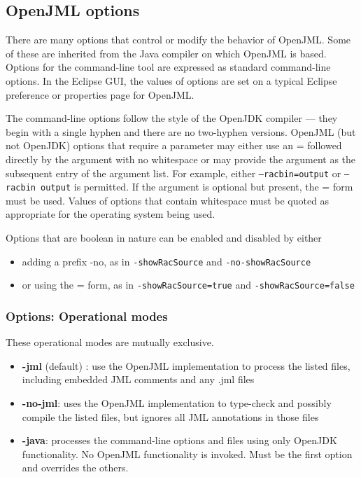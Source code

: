 \subsection{OpenJML options}

There are many options that control or modify the behavior of OpenJML. Some of these are inherited from the Java compiler on 
which OpenJML is based. Options for the command-line tool are expressed as standard command-line options. In the Eclipse GUI, the values of options are set on a typical Eclipse preference or properties page for OpenJML.

The command-line options follow the style of the OpenJDK compiler --- they begin 
with a single hyphen and there are no two-hyphen versions.
OpenJML (but not OpenJDK) options that require a parameter may either use an = followed directly by the argument with no whitespace or 
may provide the argument as the subsequent entry of the argument list. 
For example, either \texttt{--racbin=output} or
\texttt{--racbin output} is permitted. If the argument is optional 
but present, the = form must be used. Values of options that contain whitespace must be quoted as appropriate for the operating system being used.

Options that are boolean in nature can be enabled and disabled by either
\begin{itemize}[noitemsep,nolistsep]
\item adding a prefix -no, as in \texttt{-showRacSource} and \texttt{-no-showRacSource}
\item or using the = form, as in \texttt{-showRacSource=true} and \texttt{-showRacSource=false}
\end{itemize}

\subsubsection{Options: Operational modes}
These operational modes are mutually exclusive.
\begin{itemize}[noitemsep,nolistsep]
\item \textbf{-jml} (default) : use the OpenJML implementation to process the listed files, including embedded JML comments and any .jml files
\item \textbf{-no-jml}: uses the OpenJML implementation to type-check and possibly compile the listed files, but ignores all JML annotations in those files
\item \textbf{-java}: processes the command-line options and files using only OpenJDK functionality. No OpenJML functionality is invoked. Must be the first option and overrides the others.
\end{itemize}

